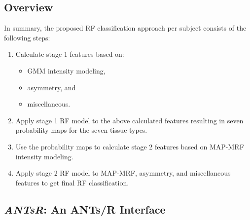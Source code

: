 \documentclass[preprint,authoryear,review,12pt]{elsarticle}
\begin{document}
\subsection{Overview}

In summary, the proposed RF classification approach per subject consists of the 
following steps:

\begin{enumerate}
  \item Calculate stage 1 features based on:  
  \begin{itemize}
    \item GMM intensity modeling,
    \item asymmetry, and
    \item miscellaneous.
  \end{itemize}
  \item Apply stage 1 RF model to the above calculated features resulting in seven 
        probability maps for the seven tissue types.  
  \item Use the probability maps to calculate stage 2 features based on MAP-MRF intensity modeling.
  \item Apply stage 2 RF model to MAP-MRF, asymmetry, and miscellaneous features to 
  get final RF classification. 
\end{enumerate}










\subsection{\textit{ANTsR}:  An ANTs/R Interface}
\end{document}
